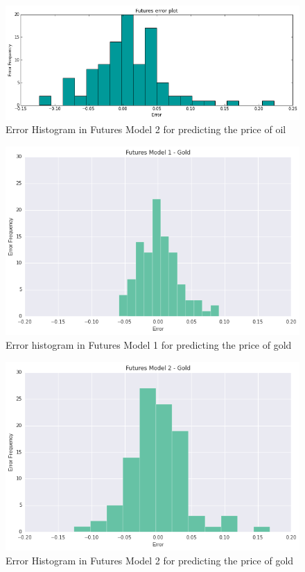 \documentclass[runningheads]{llncs}
\begin{document}
\begin{figure}
\centering
\includegraphics[width=\textwidth]{futures_oil2.png}
\caption{Error Histogram in Futures Model 2 for predicting the price of oil}
\label{fig:futures_oil2.png}
\end{figure}


\begin{figure}
\centering
\includegraphics[width=\textwidth]{futures_gold1.png}
\caption{Error histogram in Futures Model 1 for predicting the price of gold}
\label{fig:futures_gold1.png}
\end{figure}

\begin{figure}
\centering
\includegraphics[width=\textwidth]{futures_gold2.png}
\caption{Error Histogram in Futures Model 2 for predicting the price of gold}
\label{fig:futures_gold2.png}
\end{figure}
\end{document}
